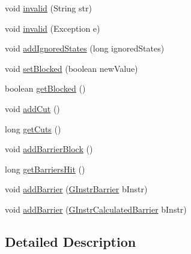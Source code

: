 \begin{DoxyCompactItemize}
\item 
void \hyperlink{interfaceorg_1_1tzi_1_1use_1_1gen_1_1assl_1_1dynamics_1_1_i_g_collector_a9e2cef82031960ec38138f967517d3a4}{invalid} (String str)
\item 
void \hyperlink{interfaceorg_1_1tzi_1_1use_1_1gen_1_1assl_1_1dynamics_1_1_i_g_collector_a610c3d5c793ac64b34a64304da6ea63c}{invalid} (Exception e)
\item 
void \hyperlink{interfaceorg_1_1tzi_1_1use_1_1gen_1_1assl_1_1dynamics_1_1_i_g_collector_a769e27d47a4bacba114ed63ca19fa9bd}{add\-Ignored\-States} (long ignored\-States)
\item 
void \hyperlink{interfaceorg_1_1tzi_1_1use_1_1gen_1_1assl_1_1dynamics_1_1_i_g_collector_a3afa97903e8c79489f19f02684aeda68}{set\-Blocked} (boolean new\-Value)
\item 
boolean \hyperlink{interfaceorg_1_1tzi_1_1use_1_1gen_1_1assl_1_1dynamics_1_1_i_g_collector_aac456a6e84eb901f51972bb27f3c70de}{get\-Blocked} ()
\item 
void \hyperlink{interfaceorg_1_1tzi_1_1use_1_1gen_1_1assl_1_1dynamics_1_1_i_g_collector_a48cd3a06388261db7b6f5ff726caa8c6}{add\-Cut} ()
\item 
long \hyperlink{interfaceorg_1_1tzi_1_1use_1_1gen_1_1assl_1_1dynamics_1_1_i_g_collector_aa20f9cff8c3168c1ef4f29bfe1ef02a5}{get\-Cuts} ()
\item 
void \hyperlink{interfaceorg_1_1tzi_1_1use_1_1gen_1_1assl_1_1dynamics_1_1_i_g_collector_a9c68bee310463632da27fa8598201319}{add\-Barrier\-Block} ()
\item 
long \hyperlink{interfaceorg_1_1tzi_1_1use_1_1gen_1_1assl_1_1dynamics_1_1_i_g_collector_a5d49245d4336128ec13fdf9737301970}{get\-Barriers\-Hit} ()
\item 
void \hyperlink{interfaceorg_1_1tzi_1_1use_1_1gen_1_1assl_1_1dynamics_1_1_i_g_collector_a5cdf0f3ca0253b828c0211942a6140e7}{add\-Barrier} (\hyperlink{classorg_1_1tzi_1_1use_1_1gen_1_1assl_1_1statics_1_1_g_instr_barrier}{G\-Instr\-Barrier} b\-Instr)
\item 
void \hyperlink{interfaceorg_1_1tzi_1_1use_1_1gen_1_1assl_1_1dynamics_1_1_i_g_collector_a1fa23205a95369b45ef49d99ac92be85}{add\-Barrier} (\hyperlink{classorg_1_1tzi_1_1use_1_1gen_1_1assl_1_1statics_1_1_g_instr_calculated_barrier}{G\-Instr\-Calculated\-Barrier} b\-Instr)
\end{DoxyCompactItemize}


\subsection{Detailed Description}


